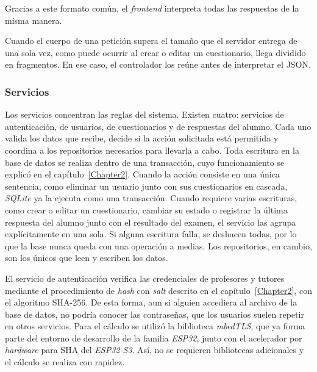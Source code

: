Gracias a este formato común, el \emph{frontend} interpreta todas las respuestas de la misma manera.

Cuando el cuerpo de una petición supera el tamaño que el servidor entrega de una sola vez, como puede ocurrir al crear o editar un cuestionario, llega dividido en fragmentos. En ese caso, el controlador los reúne antes de interpretar el JSON.

\subsubsection{Servicios}

Los servicios concentran las reglas del sistema. Existen cuatro: servicios de autenticación, de usuarios, de cuestionarios y de respuestas del alumno. Cada uno valida los datos que recibe, decide si la acción solicitada está permitida y coordina a los repositorios necesarios para llevarla a cabo. Toda escritura en la base de datos se realiza dentro de una transacción, cuyo funcionamiento se explicó en el capítulo~\ref{Chapter2}. Cuando la acción consiste en una única sentencia, como eliminar un usuario junto con sus cuestionarios en cascada, \emph{SQLite} ya la ejecuta como una transacción. Cuando requiere varias escrituras, como crear o editar un cuestionario, cambiar su estado o registrar la última respuesta del alumno junto con el resultado del examen, el servicio las agrupa explícitamente en una sola. Si alguna escritura falla, se deshacen todas, por lo que la base nunca queda con una operación a medias. Los repositorios, en cambio, son los únicos que leen y escriben los datos.


El servicio de autenticación verifica las credenciales de profesores y tutores mediante el procedimiento de \emph{hash} con \emph{salt} descrito en el capítulo~\ref{Chapter2}, con el algoritmo SHA-256. De esta forma, aun si alguien accediera al archivo de la base de datos, no podría conocer las contraseñas, que los usuarios suelen repetir en otros servicios. Para el cálculo se utilizó la biblioteca \emph{mbedTLS}, que ya forma parte del entorno de desarrollo de la familia \emph{ESP32}, junto con el acelerador por \emph{hardware} para SHA del \emph{ESP32-S3}. Así, no se requieren bibliotecas adicionales y el cálculo se realiza con rapidez.



